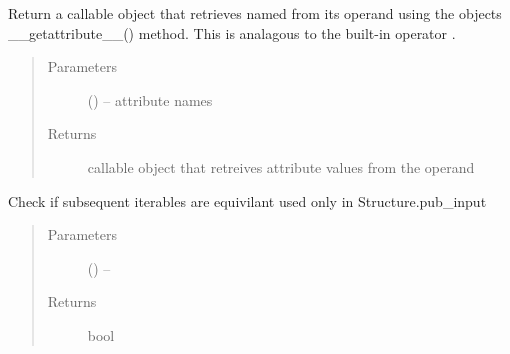 \documentclass[letterpaper,10pt,english]{sphinxmanual}
\begin{document}

\begin{fulllineitems}
\label{\detokenize{rst/utilities:mstack.utilities.attributegetter}}
Return a callable object that retrieves named  from its operand
using the objects \_\_getattribute\_\_() method. This is analagous to the built-in
operator .
\begin{quote}\begin{description}
\item[{Parameters}] \leavevmode
{} (\sphinxstyleliteralemphasis{, }) -- attribute names

\item[{Returns}] \leavevmode
callable object that retreives attribute values from the operand

\end{description}\end{quote}

\end{fulllineitems}


\begin{fulllineitems}
\label{\detokenize{rst/utilities:mstack.utilities.checkequal}}
Check if subsequent iterables are equivilant
used only in Structure.pub\_input
\begin{quote}\begin{description}
\item[{Parameters}] \leavevmode
{} () -- 

\item[{Returns}] \leavevmode
bool

\end{description}\end{quote}

\end{fulllineitems}

\end{document}
